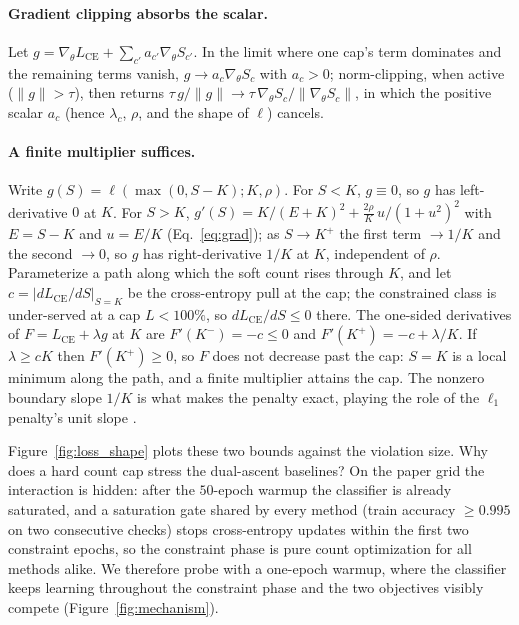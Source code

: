 \documentclass[10pt]{article}
\begin{document}
\paragraph{Gradient clipping absorbs the scalar.}
Let $g=\nabla_\theta L_{\text{CE}}+\sum_{c'}a_{c'}\nabla_\theta S_{c'}$. In
the limit where one cap's term dominates and the remaining terms vanish,
$g\to a_c\nabla_\theta S_c$ with $a_c>0$; norm-clipping, when active
($\lVert g\rVert>\tau$), then returns
$\tau\,g/\lVert g\rVert\to\tau\,\nabla_\theta S_c/\lVert\nabla_\theta
S_c\rVert$, in which the positive scalar $a_c$ (hence $\lambda_c$, $\rho$,
and the shape of $\ell$) cancels.

\paragraph{A finite multiplier suffices.}
Write $g(S)=\ell(\max(0,S{-}K);K,\rho)$. For $S<K$, $g\equiv0$, so $g$ has
left-derivative $0$ at $K$. For $S>K$,
$g'(S)=K/(E+K)^2+\tfrac{2\rho}{K}\,u/(1+u^2)^2$ with $E=S-K$ and $u=E/K$
(Eq.~\eqref{eq:grad}); as $S\to K^+$ the first term $\to1/K$ and the
second $\to0$, so $g$ has right-derivative $1/K$ at $K$, independent of
$\rho$. Parameterize a path along which the soft count rises through $K$,
and let $c=\lvert dL_{\text{CE}}/dS\rvert_{S=K}$ be the cross-entropy pull
at the cap; the constrained class is under-served at a cap $L<100\%$, so
$dL_{\text{CE}}/dS\le0$ there. The one-sided derivatives of
$F=L_{\text{CE}}+\lambda g$ at $K$ are $F'(K^-)=-c\le0$ and
$F'(K^+)=-c+\lambda/K$. If $\lambda\ge cK$ then $F'(K^+)\ge0$, so $F$
does not decrease past the cap: $S{=}K$ is a local minimum along the
path, and a finite multiplier attains the cap. The nonzero boundary slope
$1/K$ is what makes the penalty exact, playing the role of the $\ell_1$
penalty's unit slope \citep{nocedal2006numerical}.

\medskip
Figure~\ref{fig:loss_shape} plots these two bounds against the violation
size. Why does a hard count cap stress the dual-ascent baselines? On the
paper grid the interaction is hidden: after the $50$-epoch warmup the
classifier is already saturated, and a saturation gate shared by every
method (train accuracy $\ge 0.995$ on two consecutive checks) stops
cross-entropy updates within the first two constraint epochs, so the
constraint phase is pure count optimization for all methods alike. We
therefore probe with a one-epoch warmup, where the classifier keeps
learning throughout the constraint phase and the two objectives visibly
compete (Figure~\ref{fig:mechanism}).
\end{document}
